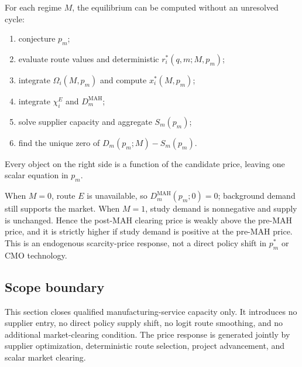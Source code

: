 For each regime \(M\), the equilibrium can be computed without an unresolved
cycle:
\begin{enumerate}
  \item conjecture \(p_m\);
  \item evaluate route values and deterministic \(r_i^*(q,m;M,p_m)\);
  \item integrate \(\Omega_i(M,p_m)\) and compute \(x_i^*(M,p_m)\);
  \item integrate \(\chi_i^E\) and \(D_m^{\mathrm{MAH}}\);
  \item solve supplier capacity and aggregate \(S_m(p_m)\);
  \item find the unique zero of \(D_m(p_m;M)-S_m(p_m)\).
\end{enumerate}
Every object on the right side is a function of the candidate price, leaving
one scalar equation in \(p_m\).

When \(M=0\), route \(E\) is unavailable, so
\(D_m^{\mathrm{MAH}}(p_m;0)=0\); background demand still supports the market.
When \(M=1\), study demand is nonnegative and supply is unchanged. Hence the
post-MAH clearing price is weakly above the pre-MAH price, and it is strictly
higher if study demand is positive at the pre-MAH price. This is an endogenous
scarcity-price response, not a direct policy shift in \(p_m^*\) or CMO
technology.

\subsection{Scope boundary}
\label{subsec:p06-scope}

This section closes qualified manufacturing-service capacity only. It introduces
no supplier entry, no direct policy supply shift, no logit route smoothing,
and no additional market-clearing condition. The price response is generated
jointly by supplier optimization, deterministic route selection, project
advancement, and scalar market clearing.
